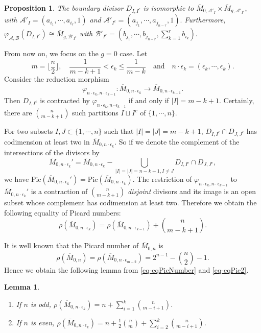 \documentclass[10pt]{amsart}
\newtheorem{proposition}[theorem]{Proposition}
\newtheorem{lemma}[theorem]{Lemma}
\theoremstyle{definition}
\def\Mzn{\overline{M}_{0,n} }
\def\Mzek{\overline{M}_{0,n\cdot \epsilon_k} }
\begin{document}
\begin{proposition}\cite[Proposition 4.5]{Hassett}\label{reduction}
The boundary divisor $D_{I,I^c}$ is isomorphic to $
\overline{M}_{0, \mathcal{A}'_I} \times \overline{M}_{g,
\mathcal{A}'_{I^c}},$ with $ \mathcal{A}'_I = (a_{i_1}, \cdots,
a_{i_r}, 1) $ and $\mathcal{A}'_{I^c}= (a_{j_1}, \cdots,
a_{j_{n-r}}, 1).$ Furthermore, $
    \varphi_{\mathcal{A}, \mathcal{B}}(D_{I, I^c})
    \cong \overline{M}_{g, \mathcal{B}'_{I^c}}$ with $ \mathcal{B}'_{I^c} = (b_{j_1}, \cdots, b_{j_{n-r}},
\sum_{k=1}^r    b_{i_k}).$
\end{proposition}

From now on, we focus on the $g=0$ case. Let $$m = \lfloor
\frac{n}{2}\rfloor,\quad \frac{1}{m-k+1} < \epsilon_k \le
\frac{1}{m-k}\quad \text{and}\quad n\cdot \epsilon_k = (\epsilon_k,
\cdots, \epsilon_k).$$ Consider the reduction morphism
\[
    \varphi_{n\cdot \epsilon_{k}, n \cdot \epsilon_{k-1}}
    : \overline{M}_{0, n \cdot \epsilon_{k}} \to
    \overline{M}_{0, n \cdot \epsilon_{k-1}}.
\]
Then $D_{I, I^c}$ is contracted by $\varphi_{n\cdot \epsilon_{k},
n \cdot \epsilon_{k-1}}$ if and only if $|I| = m - k + 1$.
Certainly, there are ${n} \choose {m-k+1}$ such partitions
$I\sqcup I^c$ of $\{1,\cdots,n\}$.

For two subsets $I, J \subset \{1, \cdots, n\}$ such that $|I| =
|J| = m - k + 1$, $D_{I, I^c} \cap D_{J, J^c}$ has codimension at
least two in $\Mzek$. So if we denote the complement of the
intersections of the divisors by
\[
    \Mzek' = \Mzek - \bigcup_{|I| = |J| = n-k+1, I \ne J} D_{I, I^c} \cap D_{J,
    J^c},
\]
we have $\mathrm{Pic}(\Mzek') = \mathrm{Pic}(\Mzek)$. The
restriction of $\varphi_{n \cdot \epsilon_{k}, n \cdot
\epsilon_{k-1}}$ to $\Mzek'$ is a contraction of ${n} \choose
{m-k+1}$ \emph{disjoint} divisors and its image is an open subset
whose complement has codimension at least two. Therefore we obtain
the following equality of Picard numbers:
\begin{equation}\label{eq-eqPicNumber}
    \rho(\overline{M}_{0, n \cdot \epsilon_{k}}) =
    \rho(\overline{M}_{0, n \cdot \epsilon_{k-1}}) + {n \choose {m-k+1}}.
\end{equation}

It is well known that the Picard number of $\Mzn$ is
\begin{equation}\label{eq-eqPic2} \rho(\Mzn)=\rho(\overline{M}_{0, n \cdot
\epsilon_{m-2}})=2^{n-1}-\binom{n}{2}-1.
\end{equation}
Hence we obtain the following lemma from \eqref{eq-eqPicNumber}
and \eqref{eq-eqPic2}.
\begin{lemma}\label{lem-PicNumMze}\begin{enumerate}\item
If $n$ is odd, $\rho(\Mzek)= n+\sum_{i=1}^k\binom{n}{m-i+1}$.\item
If $n$ is even,
$\rho(\Mzek)=n+\frac12\binom{n}{m}+\sum_{i=2}^k\binom{n}{m-i+1}$.\end{enumerate}
\end{lemma}
\end{document}
